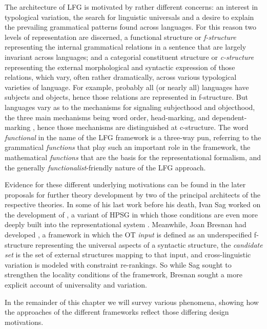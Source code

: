 The architecture of LFG is motivated by rather different concerns:  an interest in typological variation, the search for linguistic universals and a desire to explain the prevailing grammatical patterns found across languages.  For this reason two levels of representation are discerned, a functional structure or \textit{f-structure} representing the internal grammatical relations in a sentence that are largely invariant across languages; and a categorial constituent structure or \textit{c-structure} representing the external morphological and syntactic expression of those relations, which vary, often rather dramatically, across various typological varieties of language.  For example, probably all (or nearly all) languages have subjects and objects, hence those relations are represented in f-structure.  But languages vary as to the mechanisms for signaling subjecthood and objecthood,  the three main mechanisms being word order, head-marking, and dependent-marking \citep{Nichols86a-u}, hence those mechanisms are distinguished at c-structure.    The word \textit{functional} in the name of the LFG framework  is a three-way pun, referring to the grammatical \textit{functions} that play such an important role in the framework, the mathematical \textit{functions} that are the basis for the representational formalism, and the generally \textit{functionalist}-friendly nature of the LFG approach.  

Evidence for these different underlying motivations can be found in the later proposals for further theory development by two of the principal architects of the respective theories.  In some of his last work before his death, Ivan Sag worked on the development of , a variant of HPSG in which those  conditions are even more deeply built into the representational system \citep{Sag2012a}.  Meanwhile, Joan Bresnan had developed  \citep{Bresnan00-OT}, a framework in which the OT \textit{input} is defined as an underspecified f-structure representing the universal aspects of a syntactic structure, the \textit{candidate set} is the set of external structures mapping to that input, and cross-linguistic variation is modeled with constraint re-rankings.  So while Sag sought to strengthen the locality conditions of the framework, Bresnan sought a more explicit account of universality and variation.  

In the remainder of this chapter we will survey various phenomena, showing how the  approaches of the different frameworks reflect those differing design motivations.  


